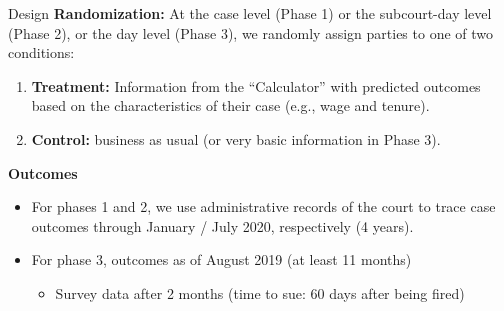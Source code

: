 \documentclass[9pt]{beamer}
\begin{document}


\begin{frame}{Design}{}
\vspace{-.5in}
   \textbf{Randomization:} At the case level (Phase 1) or the subcourt-day level (Phase 2), or the day level (Phase 3), we randomly assign parties to one of two conditions:
        
        \begin{enumerate}
            \item \textbf{Treatment:} Information from the \alert{``Calculator''} with predicted outcomes based on the characteristics of their case (e.g., wage and tenure). 
            \item \textbf{Control:} business as usual (or very basic information in Phase 3).
        \end{enumerate}
                \vspace{4mm}
      \pause         
     \textbf{Outcomes}
     \begin{itemize}
          \item For phases 1 and 2, we use administrative records of the court to trace case outcomes through January / July 2020, respectively (4 years).
          \vspace{.05in}
         \item For phase 3, outcomes as of August 2019 (at least 11 months)
         \begin{itemize}
             \item Survey data after 2 months (time to sue: 60 days after being fired)
         \end{itemize}
               
    \end{itemize}
 
\end{frame}
\end{document}
